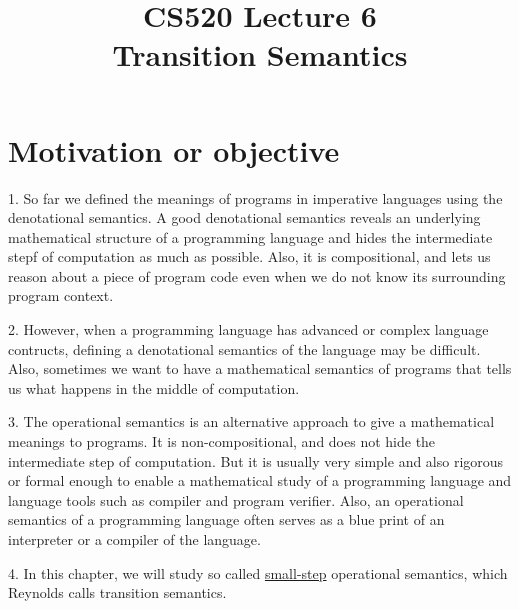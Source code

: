 \documentclass{report}[12pt]
\begin{document}
\setlength\parindent{0pt}

  {\topsep}{\topsep}%
  {\itshape}{}%
  {\bfseries}{}%
  {\newline}{}%

\theoremstyle{break}

\newtheorem{theorem}{Theorem}[section]
\newtheorem{definition}{Definition}
\newtheorem{proposition}{Proposition}
\newtheorem{corollary}{Corollary}
\newtheorem{lemma}{Lemma}
\newtheorem{example}{Example}
\newcommand{\nonterminal}[1]{\langle \text{#1}\rangle}
\newcommand{\rem}[0]{\text{ rem }}
\newcommand{\interp}[1]{\llbracket #1 \rrbracket}
\newcommand{\bbot}[0]{\Perp}
\newcommand{\TODO}[1]{TODO : #1}

\setcounter{chapter}{6}

\title{CS520 Lecture 6\\Transition Semantics}
\maketitle
\section{Motivation or objective}
1. So far we defined the meanings of programs in imperative languages using the denotational semantics. A good denotational semantics reveals an underlying mathematical structure of a programming language and hides the intermediate stepf of computation as much as possible. Also, it is compositional, and lets us reason about a piece of program code even when we do not know its surrounding program context.

2. However, when a programming language has advanced or complex language contructs, defining a denotational semantics of the language may be difficult. Also, sometimes we want to have a mathematical semantics of programs that tells us what happens in the middle of computation.

3. The operational semantics is an alternative approach to give a mathematical meanings to programs. It is non-compositional, and does not hide the intermediate step of computation. But it is usually very simple and also rigorous or formal enough to enable a mathematical study of a programming language and language tools such as compiler and program verifier. Also, an operational semantics of a programming language often serves as a blue print of an interpreter or a compiler of the language.

4. In this chapter, we will study so called \underline{small-step} operational semantics, which Reynolds calls transition semantics.
\end{document}
